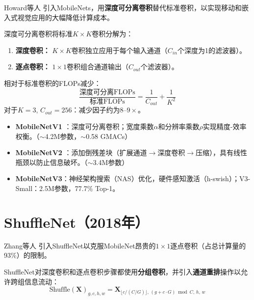 Howard等人 \cite{howard2017mobilenets}引入MobileNets，用\textbf{深度可分离卷积}替代标准卷积，以实现移动和嵌入式视觉应用的大幅降低计算成本。

深度可分离卷积将标准$K\times K$卷积分解为：
\begin{enumerate}
    \item \textbf{深度卷积：} $K\times K$卷积独立应用于每个输入通道（$C_{in}$个深度为1的滤波器）。
    \item \textbf{逐点卷积：} $1\times1$卷积组合通道输出（$C_{out}$个滤波器）。
\end{enumerate}

相对于标准卷积的FLOPs减少：
\begin{equation}
\frac{\text{深度可分离FLOPs}}{\text{标准FLOPs}} = \frac{1}{C_{out}} + \frac{1}{K^2}
\end{equation}
对于$K=3$, $C_{out}=256$：减少因子约为$8$--$9\times$。

\begin{properties}[MobileNet系列]
\begin{itemize}
    \item \textbf{MobileNetV1} \cite{howard2017mobilenets}：深度可分离卷积；宽度乘数$\alpha$和分辨率乘数$\rho$实现精度-效率权衡。（$\sim$4.2M参数，$\sim$0.58 GMACs）
    \item \textbf{MobileNetV2} \cite{sandler2018mobilenetv2}：添加倒残差块（扩展通道$\rightarrow$深度卷积$\rightarrow$压缩），具有线性瓶颈以防止信息破坏。（$\sim$3.4M参数）
    \item \textbf{MobileNetV3}：神经架构搜索（NAS）优化，硬件感知激活（h-swish）；V3-Small：2.5M参数，77.7\% Top-1。
\end{itemize}
\end{properties}

\section{ShuffleNet（2018年）}

Zhang等人 \cite{zhang2018shufflenet}引入ShuffleNet以克服MobileNet昂贵的$1\times1$逐点卷积（占总计算量的93\%）的限制。

ShuffleNet对深度卷积和逐点卷积步骤都使用\textbf{分组卷积}，并引入\textbf{通道重排}操作以允许跨组信息流动：
\begin{equation}
\text{Shuffle}(\mathbf{X})_{g,c,h,w} = \mathbf{X}_{\lfloor c/(C/G)\rfloor,\, (g + c \cdot G) \bmod C,\, h,\, w}
\end{equation}

